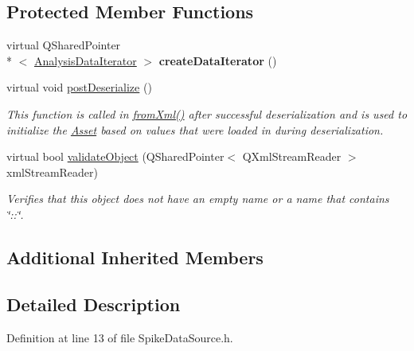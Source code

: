 \subsection*{Protected Member Functions}
\begin{DoxyCompactItemize}
\item 
\hypertarget{class_picto_1_1_spike_data_source_afe4857780b753332673fecb91e5ed0e0}{virtual Q\-Shared\-Pointer\\*
$<$ \hyperlink{class_picto_1_1_analysis_data_iterator}{Analysis\-Data\-Iterator} $>$ {\bfseries create\-Data\-Iterator} ()}\label{class_picto_1_1_spike_data_source_afe4857780b753332673fecb91e5ed0e0}

\item 
virtual void \hyperlink{class_picto_1_1_spike_data_source_aa0265d8bab873ee4e3b84a2150ce36e5}{post\-Deserialize} ()
\begin{DoxyCompactList}\small\item\em This function is called in \hyperlink{class_picto_1_1_asset_a8bed4da09ecb1c07ce0dab313a9aba67}{from\-Xml()} after successful deserialization and is used to initialize the \hyperlink{class_picto_1_1_asset}{Asset} based on values that were loaded in during deserialization. \end{DoxyCompactList}\item 
\hypertarget{class_picto_1_1_spike_data_source_a8657cb8fd2a246e2d50df7a2858dca36}{virtual bool \hyperlink{class_picto_1_1_spike_data_source_a8657cb8fd2a246e2d50df7a2858dca36}{validate\-Object} (Q\-Shared\-Pointer$<$ Q\-Xml\-Stream\-Reader $>$ xml\-Stream\-Reader)}\label{class_picto_1_1_spike_data_source_a8657cb8fd2a246e2d50df7a2858dca36}

\begin{DoxyCompactList}\small\item\em Verifies that this object does not have an empty name or a name that contains \char`\"{}\-::\char`\"{}. \end{DoxyCompactList}\end{DoxyCompactItemize}
\subsection*{Additional Inherited Members}


\subsection{Detailed Description}


Definition at line 13 of file Spike\-Data\-Source.\-h.



